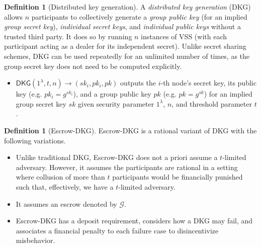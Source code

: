 \documentclass[conference]{IEEEtran}
\theoremstyle{definition}
\newtheorem{definition}[theorem]{Definition}
\theoremstyle{remark}
\begin{document}
\begin{definition}[Distributed key generation]
A \textit{distributed key generation} (DKG) \cite{pedersen1991threshold,gennaro1999secure} allows $n$ participants to collectively generate a \textit{group public key} (for an implied \textit{group secret key}), \textit{individual secret keys}, and \textit{individual public keys} without a trusted third party. It does so by running $n$ instances of VSS (with each participant acting as a dealer for its independent secret). Unlike secret sharing schemes, DKG can be used repeatedly for an unlimited number of times, as the group secret key does not need to be computed explicitly.
\begin{itemize}
    \item $\mathsf{DKG}(1^\lambda, t, n) \rightarrow (sk_i, pk_i, pk)$ outputs the $i$-th node's secret key, its public key (e.g. $pk_i = g^{sk_i}$), and a group public key $pk$ (e.g. $pk = g^{sk}$) for an implied group secret key $sk$ given security parameter $1^\lambda$, $n$, and threshold parameter $t$.
\end{itemize}
\end{definition}

\begin{definition}[Escrow-DKG]
Escrow-DKG \cite{david2019rational} is a rational variant of DKG with the following variations.
\begin{itemize}
    \item Unlike traditional DKG, Escrow-DKG does not a priori assume a $t$-limited adversary. However, it assumes the participants are rational in a setting where collusion of more than $t$ participants would be financially punished such that, effectively, we have a $t$-limited adversary.
    \item It assumes an escrow denoted by $\mathcal{G}$.
    \item Escrow-DKG has a deposit requirement, considers how a DKG may fail, and associates a financial penalty to each failure case to disincentivize misbehavior.
\end{itemize}
\end{definition}
\end{document}

